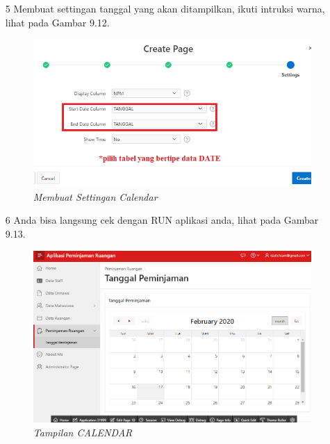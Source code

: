 \begin{itemize}
    \item[5]Membuat settingan tanggal yang akan ditampilkan, ikuti intruksi warna, lihat pada Gambar 9.12.
    \begin{figure}
        \centering
        \includegraphics[scale=0.4]{figures/date/date5.png}
        \caption{\textit{Membuat Settingan Calendar}}
        \label{Membuat Settingan Calendar}
    \end{figure}
    \item[6]Anda bisa langsung cek dengan RUN aplikasi anda, lihat pada Gambar 9.13.
    \begin{figure}
        \centering
        \includegraphics[scale=0.4]{figures/date/date6.png}
        \caption{\textit{Tampilan CALENDAR}}
        \label{Tampilan Calendar}
    \end{figure}
\end{itemize}